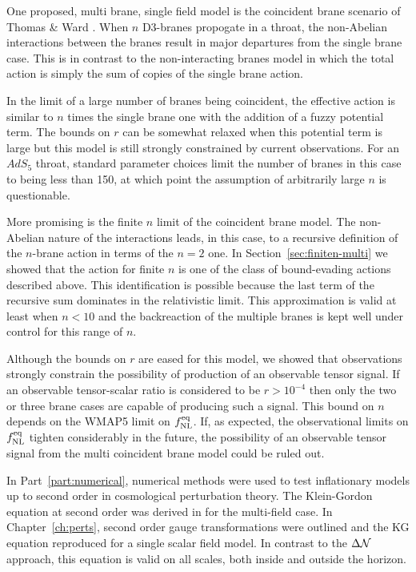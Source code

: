 One proposed, multi brane, single field model is the coincident brane scenario of
Thomas \& Ward \cite{thomasward}. When $n$ D3-branes propogate in a throat, the
non-Abelian interactions between the branes result in major departures from the
single brane case. This is in contrast to the non-interacting branes model in which
the total action is simply the sum of copies of the single brane action.

In the limit of a large number of branes being coincident, the effective action is
similar to $n$ times the single brane one with the addition of a fuzzy potential
term. The bounds on $r$ can be somewhat relaxed when this potential term is large
but this model is still strongly constrained by current observations. For an $AdS_5$
throat, standard parameter choices limit the number of branes in this case to being
less than 150, at which point the assumption of arbitrarily large $n$ is
questionable.

More promising is the finite $n$ limit of the coincident brane model. The
non-Abelian nature of the interactions leads, in this case, to a recursive definition
of the $n$-brane action in terms of the $n=2$ one. In
Section~\ref{sec:finiten-multi} we showed that the action for finite $n$ is one of
the class of bound-evading actions described above. This identification is possible
because the last term of the recursive sum dominates in the relativistic limit. This
approximation is valid at least when $n<10$ and the backreaction of the multiple
branes is kept well under control for this range of $n$.

Although the bounds on $r$ are eased
for this model, we showed that observations strongly constrain the possibility of
production of an observable tensor signal. If an observable tensor-scalar ratio is
considered to be $r>10^{-4}$ then only the two or three brane cases are capable of
producing such a signal. This bound on $n$ depends on the WMAP5 limit on $f_{\mathrm{NL}}^{\mathrm{eq}}$.
If, as expected, the observational limits on $f_{\mathrm{NL}}^{\mathrm{eq}}$ tighten considerably in the
future, the possibility of an observable tensor signal from the multi coincident
brane model could be ruled out.

In Part~\ref{part:numerical}, numerical methods were used to test inflationary
models up to second order in cosmological perturbation theory. The Klein-Gordon
equation at second order was derived in  for the multi-field
case. In Chapter~\ref{ch:perts}, second order gauge transformations were outlined
and the KG equation reproduced for a single scalar field model. In contrast to the
$\Delta \mathcal{N}$ approach, this equation is valid on all scales, both inside and outside
the horizon. 

